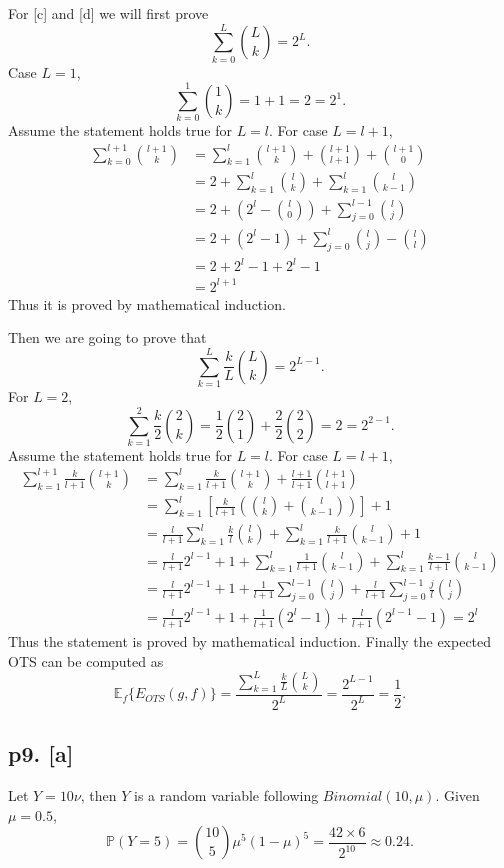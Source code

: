 For [c] and [d] we will first prove
\[
	\sum^{L}_{k=0} {L \choose k} = 2^L.
\]
Case $L=1$,
\[
    \sum^1_{k=0} {1 \choose k} = 1 + 1 = 2 = 2^1.
\]
Assume the statement holds true for $L = l$. For case $L = l+1$,
\begin{align*}
\sum^{l+1}_{k=0}{l+1 \choose k} &= \sum^{l}_{k=1}{l+1 \choose k} + {l+1 \choose l+1} + {l+1 \choose 0}\\
    &= 2 +  \sum^{l}_{k=1}{l\choose k} + \sum^{l}_{k=1}{l\choose k-1} \\
    &= 2 + \left(2^l - {l\choose 0}\right) + \sum^{l-1}_{j=0}{l\choose j} \\
    &= 2 + \left(2^l - 1\right) + \sum^{l}_{j=0}{l\choose j} - {l\choose l} \\
    &=2 + 2^l -1 + 2^l -1 \\
    &= 2^{l+1}
\end{align*}
Thus it is proved by mathematical induction.

Then we are going to prove that
\[
    \sum^{L}_{k=1}\frac{k}{L}{L\choose k} = 2^{L-1}.
\]
For $L = 2$,
\[
    \sum^{2}_{k=1}\frac{k}{2}{2\choose k} = \frac12{2\choose 1} + \frac22{2\choose 2} = 2 = 2^{2-1}.
\]
Assume the statement holds true for $L = l$. For case $L = l+1$,
\begin{align*}
\sum^{l+1}_{k=1}\frac{k}{l+1}{l+1\choose k}
&=\sum^{l}_{k=1}\frac{k}{l+1}{l+1\choose k} + \frac{l+1}{l+1}{l+1\choose l+1}\\
&=\sum^{l}_{k=1}\left[\frac{k}{l+1}\left({l\choose k} + {l\choose k-1}\right)\right] + 1\\
&=\frac{l}{l+1}\sum^{l}_{k=1}\frac{k}{l} {l\choose k} + \sum^{l}_{k=1}\frac{k}{l+1} {l\choose k-1} + 1\\
&=\frac{l}{l+1}2^{l-1} + 1 
    + \sum^{l}_{k=1}\frac{1}{l+1}{l\choose k-1} 
    + \sum^{l}_{k=1}\frac{k-1}{l+1}{l\choose k-1}\\
&=\frac{l}{l+1}2^{l-1} + 1 
    + \frac1{l+1}\sum^{l-1}_{j=0}{l\choose j} 
    + \frac{l}{l+1}\sum^{l-1}_{j=0}\frac{j}{l}{l\choose j}\\
&=\frac{l}{l+1}2^{l-1} + 1
    + \frac1{l+1}\left(2^l - 1\right)
    + \frac{l}{l+1}\left(2^{l-1} - 1\right)
= 2^l
\end{align*}
Thus the statement is proved by mathematical induction. Finally the expected OTS can be computed as
\[
\mathbb{E}_f\{E_{OTS}(g, f)\} 
    = \dfrac{\sum^{L}_{k=1}\frac{k}{L}{L\choose k}}{2^L} = \dfrac{2^{L-1}}{2^L} 
    = \dfrac12.
\]

\subsection*{p9. [a]}
Let $Y = 10\nu$, then $Y$ is a random variable following $Binomial(10, \mu)$. Given $\mu = 0.5$,
\[
    \mathbb{P}(Y=5) = {10\choose5}\mu^5(1-\mu)^5 = \frac{42\times6}{2^{10}} \approx 0.24.
\]

